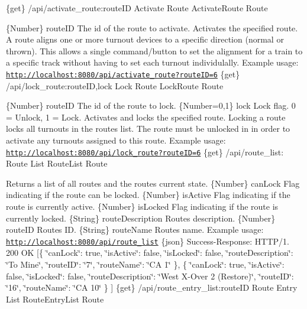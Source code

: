 \{get\} /api/activate\+\_\+route\+:route\+ID Activate Route  Activate\+Route  Route

\{Number\} route\+ID The id of the route to activate.  Activates the specified route. A route aligns one or more turnout devices to a specific direction (normal or thrown). This allows a single command/button to set the alignment for a train to a specific track without having to set each turnout individulally.  Example usage\+: \href{http://localhost:8080/api/activate_route?routeID=6}{\tt http\+://localhost\+:8080/api/activate\+\_\+route?route\+I\+D=6}  \{get\} /api/lock\+\_\+route\+:route\+ID,lock Lock Route  Lock\+Route  Route

\{Number\} route\+ID The id of the route to lock.  \{Number=0,1\} lock Lock flag. 0 = Unlock, 1 = Lock.  Activates and locks the specified route. Locking a route locks all turnouts in the route\textquotesingle{}s list. The route must be unlocked in in order to activate any turnouts assigned to this route.  Example usage\+: \href{http://localhost:8080/api/lock_route?routeID=6}{\tt http\+://localhost\+:8080/api/lock\+\_\+route?route\+I\+D=6}  \{get\} /api/route\+\_\+list\+: Route List  Route\+List  Route

Returns a list of all routes and the routes current state.  \{Number\} can\+Lock Flag indicating if the route can be locked.  \{Number\} is\+Active Flag indicating if the route is currently active.  \{Number\} is\+Locked Flag indicating if the route is currently locked.  \{String\} route\+Description Route\textquotesingle{}s description.  \{Number\} route\+ID Route\textquotesingle{}s ID.  \{String\} route\+Name Route\textquotesingle{}s name.  Example usage\+: \href{http://localhost:8080/api/route_list}{\tt http\+://localhost\+:8080/api/route\+\_\+list}  \{json\} Success-\/\+Response\+: H\+T\+T\+P/1. 200 OK \mbox{[}\{ \char`\"{}can\+Lock\char`\"{}\+: true, \char`\"{}is\+Active\char`\"{}\+: false, \char`\"{}is\+Locked\char`\"{}\+: false, \char`\"{}route\+Description\char`\"{}\+: \char`\"{}\+To Mine\char`\"{}, \char`\"{}route\+I\+D\char`\"{}\+: \char`\"{}7\char`\"{}, \char`\"{}route\+Name\char`\"{}\+: \char`\"{}\+C\+A 1\char`\"{} \}, \{ \char`\"{}can\+Lock\char`\"{}\+: true, \char`\"{}is\+Active\char`\"{}\+: false, \char`\"{}is\+Locked\char`\"{}\+: false, \char`\"{}route\+Description\char`\"{}\+: \char`\"{}\+West X-\/\+Over 2 (\+Restore)\char`\"{}, \char`\"{}route\+I\+D\char`\"{}\+: \char`\"{}16\char`\"{}, \char`\"{}route\+Name\char`\"{}\+: \char`\"{}\+C\+A 10\char`\"{} \} \mbox{]}  \{get\} /api/route\+\_\+entry\+\_\+list\+:route\+ID Route Entry List  Route\+Entry\+List  Route

